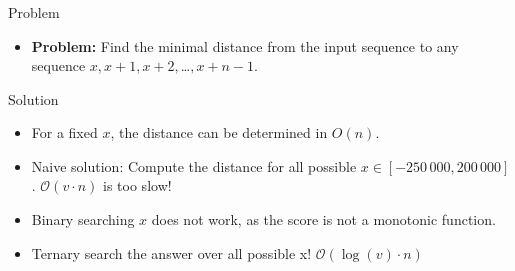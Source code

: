 \begin{frame}
    \frametitle{\problemtitle}
    \begin{block}{Problem}
    \begin{itemize}
        \item \textbf{Problem:} Find the minimal distance from the input sequence to any sequence $x, x+1, x+2, $\dots$, x+n-1$.
    \end{itemize}
    \end{block}
    \pause
    \begin{block}{Solution}
    \begin{itemize}
        \item<+-> For a fixed $x$, the distance can be determined in $O(n)$. 
        \item<+-> Naive solution: Compute the distance for all possible $x \in [-250\,000, 200\,000]$. $\mathcal O(v \cdot n)$ is too slow!
        \item<+-> Binary searching $x$ does not work, as the score is not a monotonic function.
        \item<+-> Ternary search the answer over all possible x! $\mathcal O(\log(v) \cdot n)$
    \end{itemize}
    \end{block}
\end{frame}
